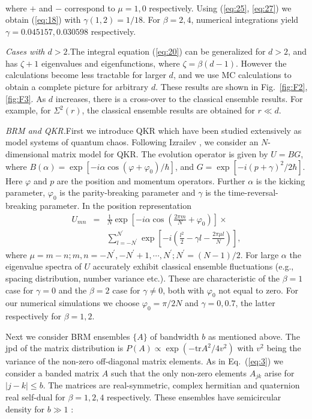 \documentclass[reprint,amsmath,amssymb,showpacs,aps,]{revtex4-1}
\begin{document}
{\begin{align}
\end{align}
where $+$ and $-$ correspond to $\mu=1, 0$ respectively.
Using (\ref{eq:25}, \ref{eq:27}) we obtain (\ref{eq:18}) with $\gamma(1,2)=1/18$.
For $\beta=2,4$, numerical integrations yield $\gamma= 0.045157, 0.030598$  respectively.\par
\textit{Cases with $d>2$.}\textemdash The integral equation (\ref{eq:20}) can be generalized for $d>2$, and has $\zeta+1$ eigenvalues and eigenfunctions, where $\zeta=\beta(d-1)$. However the calculations become less tractable for larger $d$, and we use MC calculations to obtain a complete picture for arbitrary $d$. These results are shown in Fig.~\ref{fig:F2}, \ref{fig:F3}. As $d$ increases, there is a cross-over to the classical ensemble results. For example, for $\Sigma^{2}(r)$, the classical ensemble results are obtained for $r\ll d$. \par
\textit{BRM and QKR.}\textemdash First we introduce QKR which have been studied extensively as model systems of quantum chaos. Following Izrailev \cite{FM1}, we consider an $N$-dimensional matrix model for QKR. The evolution operator is given by $U=BG$, where $B(\alpha)= \exp\left[-i\alpha \cos(\varphi +\varphi_{0})/ \hbar \right]$, and $G=\exp\left[-i(p+\gamma)^{2}/2\hbar \right]$. Here $\varphi$ and $p$ are the position and momentum operators. Further $\alpha$ is the kicking parameter, $\varphi_{0}$ is the parity-breaking parameter and $\gamma$ is the time-reversal-breaking parameter. In the position representation
\begin{eqnarray}
\label{eq:29}
U_{mn} &=& \frac{1}{N}\exp\left[-i{\alpha}\cos\left(\frac{2\pi m}{N}+\varphi_{0}\right)\right] \times \nonumber \\ 
&& \sum_{l=-N^{\prime}}^{N^{\prime}}\exp\left[-i\left(\frac{l^{2}}{2}-\gamma l-\frac{2 \pi \mu l}{N}\right)\right],
\end{eqnarray}
where $\mu= m-n; m,n=-N^{\prime},-N^{\prime}+1,\cdots,N^{\prime}; N^{\prime}=(N-1)/2$. For large $\alpha$ the eigenvalue spectra of $U$ accurately exhibit classical ensemble fluctuations (e.g., spacing distribution, number variance etc.). These are characteristic of the $\beta=1$ case for $\gamma=0$ and the $\beta=2$ case for $\gamma \neq 0$, both with $\varphi_{0}$ not equal to zero. For our numerical simulations we choose $\varphi_{0}=\pi/2N$ and $\gamma=0,0.7$, the latter respectively for $\beta=1,2$.\par
Next we consider BRM ensembles $\lbrace{A}\rbrace$ of bandwidth $b$ as mentioned above. The jpd of the matrix distribution is $P(A) \propto \exp(-\textrm{tr} A^2/4v^{2}) $ with $v^{2}$ being the variance of the non-zero off-diagonal matrix elements. As in Eq.~(\ref{eq:3}) we consider a banded matrix $A$ such that the only non-zero elements $A_{jk}$ arise for $|j-k|\leq b$. The matrices are real-symmetric, complex hermitian and quaternion real self-dual for $\beta=1,2,4$ respectively. These ensembles have semicircular density for $b\gg 1$ \cite{AP2,WFL,CCGI}:
}
\end{document}
